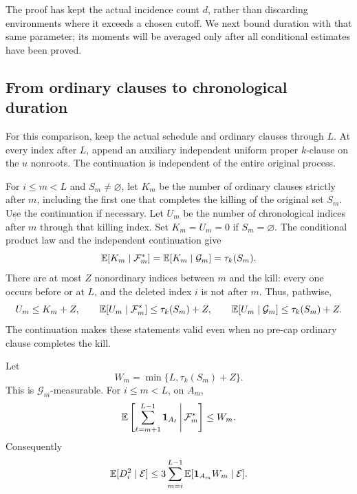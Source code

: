 The proof has kept the actual incidence count \(d\), rather than
discarding environments where it exceeds a chosen cutoff.  We next
bound duration with that same parameter; its moments will be averaged
only after all conditional estimates have been proved.

\subsection{From ordinary clauses to chronological duration}

For this comparison, keep the actual schedule and ordinary clauses
through \(L\).  At every index after \(L\), append an auxiliary
independent uniform proper \(k\)-clause on the \(u\) nonroots.
The continuation is independent of the entire original process.

For \(i\le m<L\) and \(S_m\ne\varnothing\), let \(K_m\) be the number
of ordinary clauses strictly after \(m\), including the first one
that completes the killing of the original set \(S_m\).  Use the
continuation if necessary.  Let \(U_m\) be the number of chronological
indices after \(m\) through that killing index.  Set \(K_m=U_m=0\)
if \(S_m=\varnothing\).  The conditional product law and the independent
continuation give
\begin{equation}\label{eq:ordinary-future-mean}
 \mathbb E[K_m\mid\mathcal F_m^*]
 =\mathbb E[K_m\mid\mathcal G_m]=\tau_k(S_m).
\end{equation}
There are at most \(Z\) nonordinary indices between \(m\) and the
kill: every one occurs before or at \(L\), and the deleted index
\(i\) is not after \(m\).  Thus, pathwise,
\begin{equation}\label{eq:chronological-domination}
 U_m\le K_m+Z,\qquad
 \mathbb E[U_m\mid\mathcal F_m^*]\le\tau_k(S_m)+Z,\qquad
 \mathbb E[U_m\mid\mathcal G_m]\le\tau_k(S_m)+Z.
\end{equation}
The continuation makes these statements valid even when no pre-cap
ordinary clause completes the kill.

\begin{lemma}\label{lem:weighted-delay}
Let
\[
 W_m=\min\{L,\tau_k(S_m)+Z\}.
\]
This is \(\mathcal G_m\)-measurable.  For \(i\le m<L\), on \(A_m\),
\begin{equation}\label{eq:future-deletion-delay}
 \mathbb E\left[\sum_{\ell=m+1}^{L-1}\mathbf1_{A_\ell}
       \,\middle|\,\mathcal F_m^*\right]\le W_m.
\end{equation}
Consequently
\begin{equation}\label{eq:conditional-weighted-delay}
 \mathbb E[D_i^2\mid\mathcal E]
 \le3\sum_{m=i}^{L-1}
        \mathbb E[\mathbf1_{A_m}W_m\mid\mathcal E].
\end{equation}
\end{lemma}

